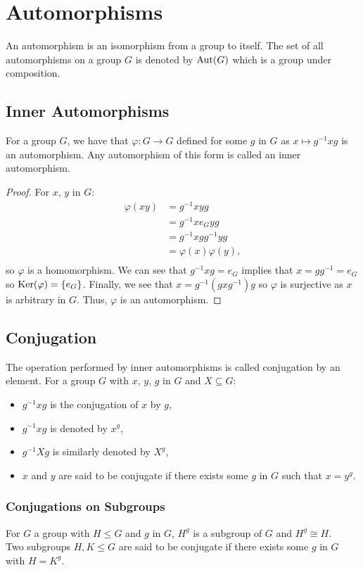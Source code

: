 \section{Automorphisms}

An automorphism is an isomorphism from a group to itself. The set of
all automorphisms on a group $G$ is denoted by $\operatorname{Aut}(G)$ which
is a group under composition.

\subsection{Inner Automorphisms}

For a group $G$, we have that $\varphi : G \to G$ defined for some $g$ in $G$ 
as  $x \mapsto g^{-1}xg$ is an automorphism. Any automorphism of this
form is called an inner automorphism.

\begin{proof}
    For $x$, $y$ in $G$: \begin{align*}
        \varphi(xy) &= g^{-1}xyg \\
        &= g^{-1}xe_Gyg \\
        &= g^{-1}xgg^{-1}yg \\
        &= \varphi(x)\varphi(y), \\
    \end{align*} so $\varphi$ is a homomorphism. We can see that 
    $g^{-1}xg = e_G$ implies that $x = gg^{-1} = e_G$ so 
    $\operatorname{Ker}(\varphi) = \{e_G\}$. Finally, we see that $x = g^{-1}(gxg^{-1})g$
    so $\varphi$ is surjective as $x$ is arbitrary in $G$. 
    Thus, $\varphi$ is an automorphism.
\end{proof}

\subsection{Conjugation}

The operation performed by inner automorphisms is called conjugation
by an element. For a group $G$ with $x$, $y$, $g$ in $G$ and $X \subseteq G$:
\begin{itemize}
    \item $g^{-1}xg$ is the conjugation of $x$ by $g$,
    \item $g^{-1}xg$ is denoted by $x^g$,
    \item $g^{-1}Xg$ is similarly denoted by $X^g$,
    \item $x$ and $y$ are said to be conjugate if there exists some $g$ in
        $G$ such that $x = y^g$.
\end{itemize}

\subsubsection{Conjugations on Subgroups}

For $G$ a group with $H \leq G$ and $g$ in $G$, $H^g$ is a subgroup of
$G$ and $H^g \cong H$.
\\[\baselineskip]
Two subgroups $H, K \leq G$ are said to be conjugate if there exists some
$g$ in $G$ with $H = K^g$. 